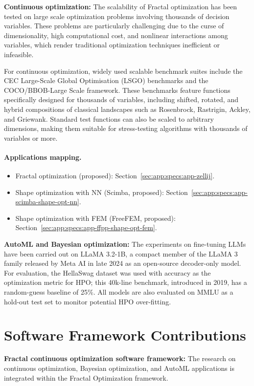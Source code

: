 {\bf Continuous optimization:} The scalability of Fractal optimization has been tested on large scale optimization problems involving thousands of decision variables. These problems are particularly challenging due to the curse of dimensionality, high computational cost, and nonlinear interactions among variables, which render traditional optimization techniques inefficient or infeasible.

For continuous optimization, widely used scalable benchmark suites include the CEC Large-Scale Global Optimisation (LSGO) benchmarks and the COCO/BBOB-Large Scale framework. These benchmarks feature functions specifically designed for thousands of variables, including shifted, rotated, and hybrid compositions of classical landscapes such as Rosenbrock, Rastrigin, Ackley, and Griewank. Standard test functions can also be scaled to arbitrary dimensions, making them suitable for stress-testing algorithms with thousands of variables or more.

\paragraph{Applications mapping.}
\begin{itemize}
	\item Fractal optimization (proposed): Section~\ref{sec:app:specs:app-zellij}.
	\item Shape optimization with NN (Scimba, proposed): Section~\ref{sec:app:specs:app-scimba-shape-opt-nn}.
	\item Shape optimization with FEM (FreeFEM, proposed): Section~\ref{sec:app:specs:app-ffpp-shape-opt-fem}.
\end{itemize}

\medskip

{\bf AutoML and Bayesian optimization:} The experiments on fine-tuning LLMs have been carried out on LLaMA 3.2-1B, a compact member of the LLaMA 3 family released by Meta AI in late 2024 as an open-source decoder-only model. For evaluation, the HellaSwag dataset was used with accuracy as the optimization metric for HPO; this 40k-line benchmark, introduced in 2019, has a random-guess baseline of 25\%. All models are also evaluated on MMLU as a hold-out test set to monitor potential HPO over-fitting. 

%   

\section{Software Framework Contributions}
{\bf Fractal continuous optimization software framework:} The research on continuous optimization, Bayesian optimization, and AutoML applications is integrated within the Fractal Optimization framework.

